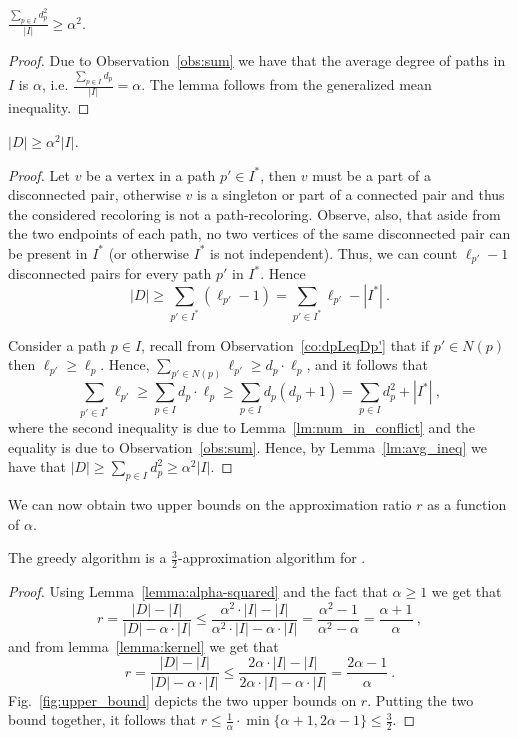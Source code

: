 \begin{lemma}
\label{lm:avg_ineq}
$\frac{\sum_{p \in I}{d_p^2}}{|I|} \geq \alpha^2$.
\end{lemma}
\begin{proof}
Due to Observation~\ref{obs:sum} we have that the average degree of
paths in $I$ is $\alpha$, i.e. $\frac{\sum_{p \in I}{d_p}}{|I|}
= \alpha$.  The lemma follows from the generalized mean inequality.
\end{proof}


\begin{lemma}
\label{lemma:alpha-squared}
$|D| \geq \alpha^2|I|$.
\end{lemma}
\begin{proof}
Let $v$ be a vertex in a path $p' \in I^*$, then $v$ must be a part of
a disconnected pair, otherwise $v$ is a singleton or part of a
connected pair and thus the considered recoloring is not a
path-recoloring.  Observe, also, that aside from the two endpoints of
each path, no two vertices of the same disconnected pair can be
present in $I^*$ (or otherwise $I^*$ is not independent).  Thus, we
can count $\ell_{p'} - 1$ disconnected pairs for every path $p'$ in
$I^*$.  Hence
\[
|D| \geq \sum_{p' \in I^*} (\ell_{p'} - 1) = \sum_{p' \in I^*}{\ell_{p'}} -
|I^*| ~.
\]

Consider a path $p \in I$, recall from Observation~\ref{co:dpLeqDp'}
that if $p' \in N(p)$ then $\ell_{p'} \geq \ell_p$.  Hence, $\sum_{p'
  \in N(p)}{\ell_{p'}} \geq d_p \cdot \ell_p$, and it follows that
\[
\sum_{p' \in I^*} \ell_{p'}
\geq \sum_{p \in I} d_p \cdot \ell_p
\geq \sum_{p \in I} d_p(d_p+1)
=    \sum_{p \in I} d_p^2 + |I^*|
~,
\]
where the second inequality is due to Lemma~\ref{lm:num_in_conflict}
and the equality is due to Observation~\ref{obs:sum}.
Hence, by Lemma~\ref{lm:avg_ineq} we have that
\(
|D| \geq \sum_{p \in I} d_p^2 \geq \alpha^2 |I|
\).
\end{proof}

We can now obtain two upper bounds on the approximation ratio $r$ as a
function of $\alpha$.

\begin{theorem}
The greedy algorithm is a $\frac{3}{2}$-approximation algorithm for
\TWOCR{}.
\end{theorem}
\begin{proof}
Using Lemma~\ref{lemma:alpha-squared} and the fact that $\alpha \geq 1$ we get
that
$$
r
=    \frac{|D| - |I|}{|D| - \alpha \cdot |I|}
\leq \frac{\alpha ^ 2 \cdot |I| - |I|}{\alpha ^ 2 \cdot |I| - \alpha \cdot |I|}
=    \frac{\alpha ^ 2 - 1}{\alpha ^ 2 - \alpha}
=    \frac{\alpha+1}{\alpha}
~, 
$$
and from lemma~\ref{lemma:kernel} we get that
$$
r
=    \frac{|D| - |I|}{|D| - \alpha \cdot |I|}
\leq \frac{2 \alpha \cdot |I| - |I|}{2 \alpha \cdot |I| - \alpha \cdot |I|}
=    \frac{2 \alpha - 1}{\alpha}
~.
$$
Fig.~\ref{fig:upper_bound} depicts the two upper bounds on $r$.
Putting the two bound together, it follows that
\(
r
\leq \frac{1}{\alpha} \cdot \min\{\alpha+1,2\alpha-1\}
\leq    \frac{3}{2}
\).
\end{proof}



